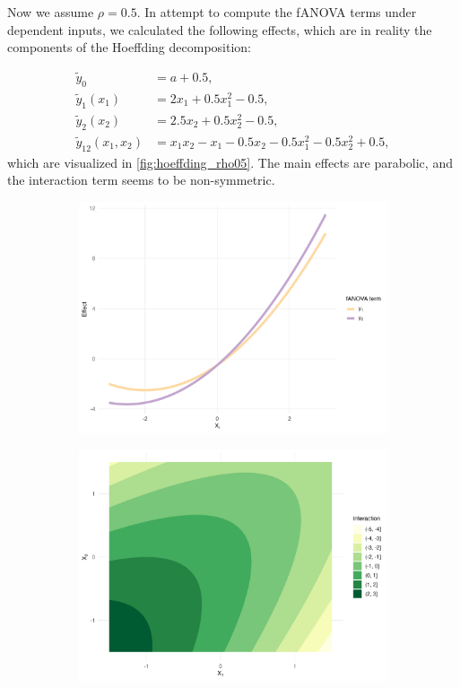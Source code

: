 Now we assume $\rho = 0.5$. In attempt to compute the fANOVA terms under dependent inputs, we calculated the following effects, which are in reality the components of the Hoeffding decomposition:

\begin{align*}
\tilde{y}_0 &= a + 0.5, \\[3pt]
\tilde{y}_1(x_1) &= 2x_1 + 0.5x_1^2 - 0.5, \\[3pt]
\tilde{y}_2(x_2) &= 2.5x_2 + 0.5x_2^2 - 0.5, \\[3pt]
\tilde{y}_{12}(x_1,x_2) &= x_1x_2 - x_1 - 0.5x_2 - 0.5x_1^2 - 0.5x_2^2 + 0.5,
\end{align*}
which are visualized in \autoref{fig:hoeffding_rho05}. The main effects are parabolic, and the interaction term seems to be non-symmetric.
\begin{figure}[htpb]
    \centering
    \begin{subfigure}[t]{0.49\textwidth}
        \centering
        \includegraphics[width=\textwidth]{images/experiment_section/hoeffding_rho05_main.png}
    \end{subfigure}%
    \hfill
    \begin{subfigure}[t]{0.49\textwidth}
        \centering
        \includegraphics[width=\textwidth]{images/experiment_section/hoeffding_rho05_interaction.png}

\end{subfigure}
\end{figure}
